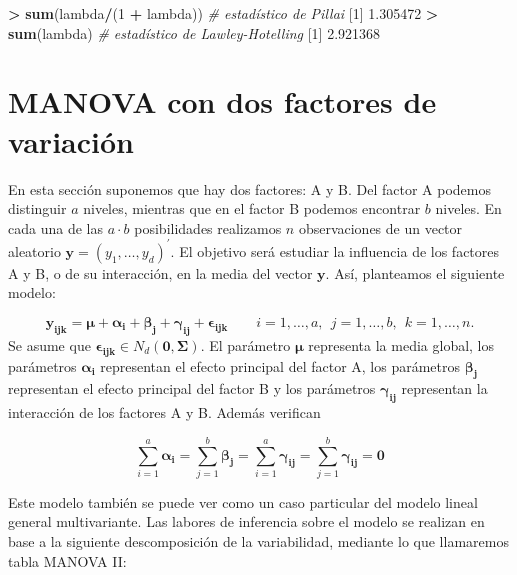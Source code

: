 \documentclass[
  a4paper,
  oneside]{scrbook}
\newenvironment{Shaded}{\begin{snugshade}}{\end{snugshade}}
\newcommand{\CommentTok}[1]{\textcolor[rgb]{0.56,0.35,0.01}{\textit{#1}}}
\newcommand{\DecValTok}[1]{\textcolor[rgb]{0.00,0.00,0.81}{#1}}
\newcommand{\FloatTok}[1]{\textcolor[rgb]{0.00,0.00,0.81}{#1}}
\newcommand{\FunctionTok}[1]{\textcolor[rgb]{0.13,0.29,0.53}{\textbf{#1}}}
\newcommand{\NormalTok}[1]{#1}
\newcommand{\SpecialCharTok}[1]{\textcolor[rgb]{0.81,0.36,0.00}{\textbf{#1}}}
\theoremstyle{definition}
\theoremstyle{definition}
\theoremstyle{definition}
\theoremstyle{definition}
\theoremstyle{remark}
\begin{document}
\footnotesize

\begin{Shaded}
\begin{Highlighting}[]
\SpecialCharTok{\textgreater{}} \FunctionTok{sum}\NormalTok{(lambda}\SpecialCharTok{/}\NormalTok{(}\DecValTok{1} \SpecialCharTok{+}\NormalTok{ lambda))  }\CommentTok{\# estadístico de Pillai}
\NormalTok{[}\DecValTok{1}\NormalTok{] }\FloatTok{1.305472}
\SpecialCharTok{\textgreater{}} \FunctionTok{sum}\NormalTok{(lambda)  }\CommentTok{\# estadístico de Lawley{-}Hotelling}
\NormalTok{[}\DecValTok{1}\NormalTok{] }\FloatTok{2.921368}
\end{Highlighting}
\end{Shaded}

\normalsize

\section{MANOVA con dos factores de variación}\label{manova-con-dos-factores-de-variacion}

En esta sección suponemos que hay dos factores: A y B. Del factor A
podemos distinguir \(a\) niveles, mientras que en el factor B podemos
encontrar \(b\) niveles. En cada una de las \(a\cdot b\) posibilidades
realizamos \(n\) observaciones de un vector aleatorio
\(\bm{y}=(y_1,\ldots,y_d)^\prime{}\). El objetivo será estudiar la
influencia de los factores A y B, o de su interacción, en la media del
vector \(\bm{y}\). Así, planteamos el siguiente modelo:

\[\bm{y_{ijk}}=\bm{\mu}+\bm{\alpha_i}+\bm{\beta_j}+\bm{\gamma_{ij}}+{\bm{\epsilon_{ijk}}} \qquad i=1,\ldots,a, \ \ j=1,\ldots,b, \ \ k=1,\ldots,n.\]
Se asume que \({\bm{\epsilon_{ijk}}}\in N_d(\bm{0},\bm\Sigma)\). El
parámetro \(\bm{\mu}\) representa la media global, los parámetros
\(\bm{\alpha_i}\) representan el efecto principal del factor A, los
parámetros \(\bm{\beta_j}\) representan el efecto principal del factor B y
los parámetros \(\bm{\gamma_{ij}}\) representan la interacción de los
factores A y B. Además verifican

\[\sum_{i=1}^a \bm{\alpha_i}=\sum_{j=1}^b \bm{\beta_j}=\sum_{i=1}^a \bm{\gamma_{ij}}
=\sum_{j=1}^b\bm{\gamma_{ij}}=\bm{0}\]

Este modelo también se puede ver como un caso particular del modelo
lineal general multivariante. Las labores de inferencia sobre el modelo
se realizan en base a la siguiente descomposición de la variabilidad,
mediante lo que llamaremos tabla MANOVA II:
\end{document}
